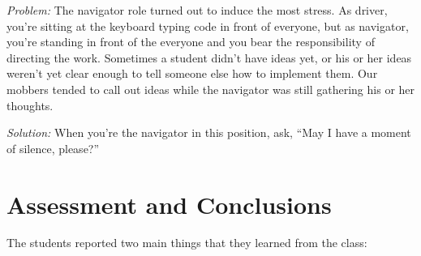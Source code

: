 \documentclass{article}
\begin{document}
\begin{comment}
\emph{Problem:} The term ``software design'' is highly ambiguous.
Different experts hold radically different conceptions, from
Jack Reeves' view that ``the source code is the
design'' \cite{reeves1992software} to IEEE~1016--2009, which specifies
12~``design viewpoints'', each with its own design entities, design
relationships, and design attributes, to be described in a design language
such as UML \cite{IEEE1016-2009}. The number of aspects or elements of software
design is mind-boggling, and each comes with its own opinionated camps and
controversies: high-level design, low-level design, system design, interface
design (which can mean user-interface design, interaction design,
communication protocols, or class method signatures, depending on who's
talking), database design, architectural design, GoF design patterns, ways of
organizing source code into subroutines, and more. How can one course cover so
many topics, and steer between the Scylla and Charybdis of pushing a
controversial position on the students and letting students wander without
guidance into completely uninformed opinions?

\emph{Solution:} The first readings were on three radically different
conceptions of design, one by Dave Parnas, one by Alan Cooper, and the above
article by Jack Reeves.
\end{comment}

\emph{Problem:} The navigator role turned out to induce the most stress. As
driver, you're sitting at the keyboard typing code in front of everyone, but
as navigator, you're standing in front of the everyone and you bear the
responsibility of directing the work. Sometimes a student didn't have ideas
yet, or his or her ideas weren't yet clear enough to tell someone else how to
implement them. Our mobbers tended to call out ideas while the navigator was
still gathering his or her thoughts.

\emph{Solution:} When you're the navigator in this position, ask, ``May I have
a moment of silence, please?''

\section{Assessment and Conclusions}

The students reported two main things that they learned from the class:
\end{document}
